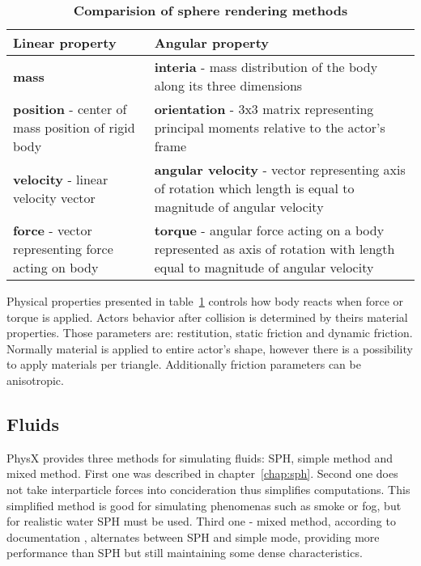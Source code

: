 \begin{table}[htdp]
\caption[Rigid body parameters]{\textbf{Comparision of sphere rendering methods}}
\centering
    \begin{tabular}{|p{6.5cm}|p{7cm}|}
        \hline
        {\bf Linear property } & {\bf Angular property } \\ \hline
       {\bf  mass }          & {\bf  interia } - mass distribution of the body along its three dimensions         \\ 
        {\bf  position } - center of mass position of rigid body       & {\bf  orientation } - 3x3 matrix representing  principal moments relative to the actor's frame     \\ 
        {\bf  velocity } - linear velocity vector      & {\bf  angular velocity } - vector representing axis of rotation which length is equal to magnitude of angular velocity \\ 
        {\bf  force } - vector representing force acting on body     & {\bf  torque } - angular force acting on a body represented as axis of rotation with length equal to magnitude of angular velocity          \\
        \hline
    \end{tabular}
\label{tab:rigid_body_properties}
\end{table}

Physical properties presented in table~\ref{tab:rigid_body_properties} controls how body reacts when force or torque is applied. Actors behavior after collision is determined by theirs material properties. Those parameters are: restitution, static friction and dynamic friction. Normally material is applied to entire actor's shape, however there is a possibility to apply materials per triangle. Additionally friction parameters can be anisotropic. 
\subsection{Fluids}
PhysX provides three methods for simulating fluids: SPH, simple method and mixed method. First one was described in chapter~\ref{chap:sph}. Second one does not take interparticle forces into concideration thus simplifies computations. This simplified method is good for simulating phenomenas such as smoke or fog, but for realistic water SPH must be used. Third one - mixed method, according to documentation \cite{PhysXDoc}, alternates between SPH and simple mode, providing more performance than SPH but still maintaining some dense characteristics.

